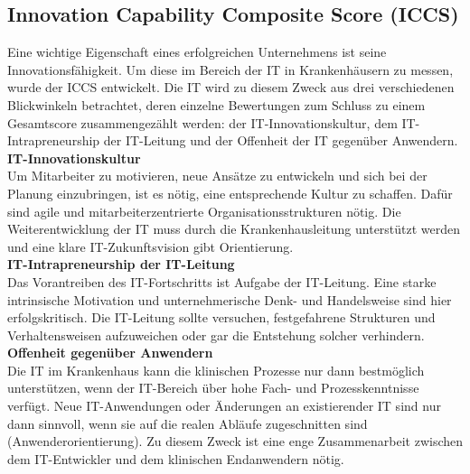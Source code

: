 \subsection{Innovation Capability Composite Score (ICCS)}
	Eine wichtige Eigenschaft eines erfolgreichen Unternehmens ist seine Innovationsfähigkeit. Um diese im Bereich der IT in Krankenhäusern zu messen, wurde der ICCS entwickelt. Die IT wird zu diesem Zweck aus drei verschiedenen Blickwinkeln betrachtet, deren einzelne Bewertungen zum Schluss zu einem Gesamtscore zusammengezählt werden: der IT-Innovationskultur, dem IT-Intrapreneurship der IT-Leitung und der Offenheit der IT gegenüber Anwendern. \parencite{huebner2019}
	\vspace{\parheadvspace}\\
	\textbf{IT-Innovationskultur}\\
	Um Mitarbeiter zu motivieren, neue Ansätze zu entwickeln und sich bei der Planung einzubringen, ist es nötig, eine entsprechende Kultur zu schaffen. Dafür sind agile und mitarbeiterzentrierte Organisationsstrukturen nötig. Die Weiterentwicklung der IT muss durch die Krankenhausleitung unterstützt werden und eine klare IT-Zukunftsvision gibt Orientierung.
	\vspace{\parheadvspace}\\
	\textbf{IT-Intrapreneurship der IT-Leitung}\\
	Das Vorantreiben des IT-Fortschritts ist Aufgabe der IT-Leitung. Eine starke intrinsische Motivation und unternehmerische Denk- und Handelsweise sind hier erfolgskritisch. Die IT-Leitung sollte versuchen, festgefahrene Strukturen und Verhaltensweisen aufzuweichen oder gar die Entstehung solcher verhindern.
	\vspace{\parheadvspace}\\
	\textbf{Offenheit gegenüber Anwendern}\\
	Die IT im Krankenhaus kann die klinischen Prozesse nur dann bestmöglich unterstützen, wenn der IT-Bereich über hohe Fach- und Prozesskenntnisse verfügt. Neue IT-Anwendungen oder Änderungen an existierender IT sind nur dann sinnvoll, wenn sie auf die realen Abläufe zugeschnitten sind (Anwenderorientierung). Zu diesem Zweck ist eine enge Zusammenarbeit zwischen dem IT-Entwickler und dem klinischen Endanwendern nötig.

